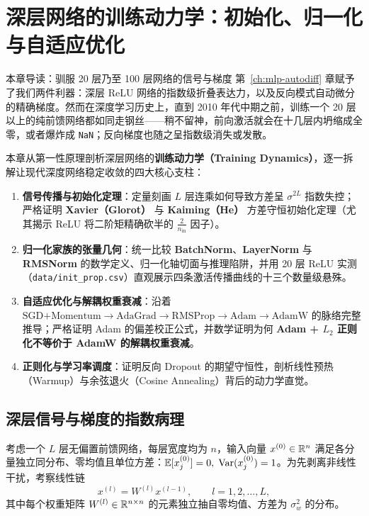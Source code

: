 \chapter[深层训练动力学：初始化与优化]{深层网络的训练动力学：初始化、归一化与自适应优化}
\label{ch:train-dynamics}


\begin{chapIntro}{本章导读：驯服 20 层乃至 100 层网络的信号与梯度}
第~\ref{ch:mlp-autodiff} 章赋予了我们两件利器：深层 ReLU 网络的指数级折叠表达力，以及反向模式自动微分的精确梯度。然而在深度学习历史上，直到 2010 年代中期之前，训练一个 20 层以上的纯前馈网络都如同走钢丝——稍不留神，前向激活就会在十几层内坍缩成全零，或者爆炸成 \texttt{NaN}；反向梯度也随之呈指数级消失或发散。

本章从第一性原理剖析深层网络的\textbf{训练动力学（Training Dynamics）}，逐一拆解让现代深度网络稳定收敛的四大核心支柱：
\begin{enumerate}
  \item \textbf{信号传播与初始化定理}：定量刻画 $L$ 层连乘如何导致方差呈 $\sigma^{2L}$ 指数失控；严格证明 \textbf{Xavier（Glorot）} 与 \textbf{Kaiming（He）} 方差守恒初始化定理（尤其揭示 ReLU 将二阶矩精确砍半的 $\frac{2}{n_{\text{in}}}$ 因子）。
  \item \textbf{归一化家族的张量几何}：统一比较 \textbf{BatchNorm}、\textbf{LayerNorm} 与 \textbf{RMSNorm} 的数学定义、归一化轴切面与推理陷阱，并用 20 层 ReLU 实测（\texttt{data/init\_prop.csv}）直观展示四条激活传播曲线的十三个数量级悬殊。
  \item \textbf{自适应优化与解耦权重衰减}：沿着 $\text{SGD+Momentum} \to \text{AdaGrad} \to \text{RMSProp} \to \text{Adam} \to \text{AdamW}$ 的脉络完整推导；严格证明 Adam 的偏差校正公式，并数学证明为何 \textbf{Adam + $L_2$ 正则化不等价于 AdamW 的解耦权重衰减}。
  \item \textbf{正则化与学习率调度}：证明反向 Dropout 的期望守恒性，剖析线性预热（Warmup）与余弦退火（Cosine Annealing）背后的动力学直觉。
\end{enumerate}
\end{chapIntro}

\section{深层信号与梯度的指数病理}
\label{sec:vanishing-exploding}

考虑一个 $L$ 层无偏置前馈网络，每层宽度均为 $n$，输入向量 $x^{(0)} \in \mathbb{R}^n$ 满足各分量独立同分布、零均值且单位方差：$\mathbb{E}[x^{(0)}_j] = 0,\; \operatorname{Var}(x^{(0)}_j) = 1$。为先剥离非线性干扰，考察线性链
\[
  x^{(l)} = W^{(l)} x^{(l-1)}, \qquad l = 1, 2, \dots, L,
\]
其中每个权重矩阵 $W^{(l)} \in \mathbb{R}^{n \times n}$ 的元素独立抽自零均值、方差为 $\sigma_w^2$ 的分布。


